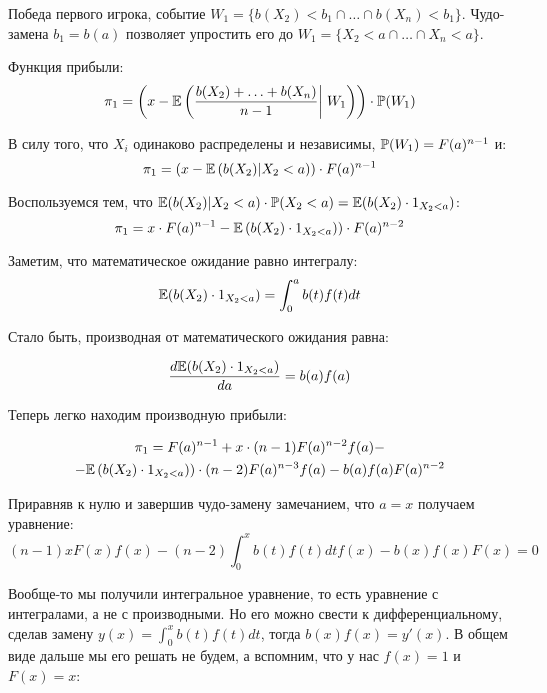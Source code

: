 \begin{enumerate}
Победа первого игрока, событие $ W_{1}=\{b(X_{2})<b_{1}\cap \ldots\cap b(X_{n})<b_{1}\} $. Чудо-замена  $ b_{1}=b(a) $ позволяет упростить его до $ W_{1}=\{X_{2}<a\cap\ldots\cap X_{n}<a\} $.

Функция прибыли:
\begin{equation}
\pi_{1}=\left(x-\E\left(\frac{b(X_{2})+\ldots+b(X_{n})}{n-1} \right|\left.\vphantom{\frac{b(X_{2})+\ldots+b(X_{n})}{n-1}} W_{1}\right)\right)\cdot \P(W_{1})
\end{equation}

В силу того, что $ X_{i} $ одинаково распределены и независимы, $ \P(W_{1})=F(a)^{n-1} $ и:
\begin{equation}
\pi_{1}=(x-\E\left(b(X_{2})|X_{2}<a)\right)\cdot F(a)^{n-1}
\end{equation}

Воспользуемся тем, что $ \E(b(X_{2})|X_{2}<a)\cdot \P(X_{2}<a)=\E(b(X_{2})\cdot 1_{X_{2}<a}) $:
\begin{equation}
\pi_{1}=x\cdot F(a)^{n-1}-\E\left(b(X_{2})\cdot 1_{X_{2}<a})\right)\cdot F(a)^{n-2}
\end{equation}

Заметим, что математическое ожидание равно интегралу:
\begin{equation}
\E(b(X_{2})\cdot 1_{X_{2}<a})=\int_{0}^{a}b(t)f(t)dt
\end{equation}

Стало быть, производная от математического ожидания равна:

\begin{equation}
\frac{d \E(b(X_{2})\cdot 1_{X_{2}<a})}{d a}=b(a)f(a)
\end{equation}

Теперь легко находим производную прибыли:

\begin{multline}
\pi_{1}=F(a)^{n-1}+x\cdot (n-1) F(a)^{n-2}f(a)-\\
-\E\left(b(X_{2})\cdot 1_{X_{2}<a})\right)\cdot (n-2)F(a)^{n-3}f(a)-b(a)f(a)F(a)^{n-2}
\end{multline}

Приравняв к нулю и завершив чудо-замену замечанием, что $ a=x $ получаем уравнение:
\begin{equation}
(n-1)xF(x)f(x)-(n-2)\int_{0}^{x}b(t)f(t)dt f(x)-b(x)f(x)F(x)=0
\end{equation}

Вообще-то мы получили интегральное уравнение, то есть уравнение с интегралами, а не с производными. Но его можно свести к дифференциальному, сделав замену $ y(x)=\int_{0}^{x}b(t)f(t)dt $, тогда $ b(x)f(x)=y'(x) $. В общем виде дальше мы его решать не будем, а вспомним, что у нас $ f(x)=1 $ и $ F(x)=x $:


\end{enumerate}
